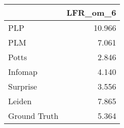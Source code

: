 \begin{tabular}{lr}
\toprule
{} & LFR_om_6 \\
\midrule
PLP          &   10.966 \\
PLM          &    7.061 \\
Potts        &    2.846 \\
Infomap      &    4.140 \\
Surprise     &    3.556 \\
Leiden       &    7.865 \\
Ground Truth &    5.364 \\
\bottomrule
\end{tabular}
